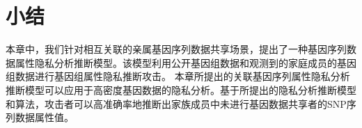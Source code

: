 \section{小结}

本章中，我们针对相互关联的亲属基因序列数据共享场景，提出了一种基因序列数据属性隐私分析推断模型。该模型利用公开基因组数据和观测到的家庭成员的基因组数据进行基因组属性隐私推断攻击。 本章所提出的关联基因序列属性隐私分析推断模型可以应用于高密度基因数据的隐私分析。基于所提出的隐私分析推断模型和算法，攻击者可以高准确率地推断出家族成员中未进行基因数据共享者的SNP序列数据属性值。




	


	

